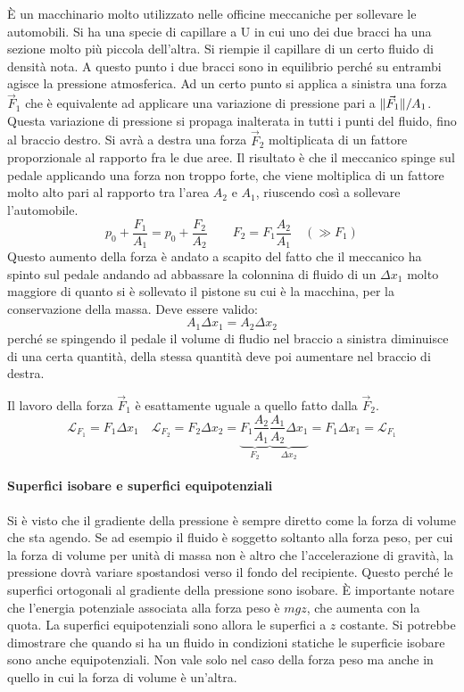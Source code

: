 \documentclass[10pt,a4paper]{book}
\DeclarePairedDelimiter{\norma}{\lVert}{\rVert} %
\begin{document}
\FloatBarrier
È un macchinario molto utilizzato nelle officine meccaniche per sollevare le automobili.  Si ha una specie di capillare a U in cui uno dei due bracci ha una sezione molto più piccola dell'altra. Si riempie il capillare di un certo fluido di densità nota. A questo punto i due bracci sono in equilibrio perché su entrambi agisce la pressione atmosferica. Ad un certo punto si applica a sinistra una forza $\vec{F}_1$ che è equivalente ad applicare una variazione di pressione pari a $\norma{\vec{F}_1}/A_1$. Questa variazione di pressione si propaga inalterata in tutti i punti del fluido, fino al braccio destro. Si avrà a destra una forza $\vec{F}_2$ moltiplicata di un fattore proporzionale al rapporto fra le due aree. Il risultato è che il meccanico spinge sul pedale applicando una forza non troppo forte, che viene moltiplica di un fattore molto alto pari al rapporto tra l'area $A_2$ e $A_1$, riuscendo così a sollevare l'automobile.
\[
	p_0+ \frac{F_1 }{A_1 } = p_0 + \frac{F_2 }{A_2 } \qquad F_2 = F_1\frac{A_2 }{A_1 } \quad (\gg F_1 )
\]
Questo aumento della forza è andato a scapito del fatto che il meccanico ha spinto sul pedale andando ad abbassare la colonnina di fluido di un $\Delta x_1$ molto maggiore di quanto si è sollevato il pistone su cui è la macchina, per la conservazione della massa. Deve essere valido:
\[
	A_1\Delta x_1 = A_2\Delta x_2
\]
perché se spingendo il pedale il volume di fludio nel braccio a sinistra diminuisce di una certa quantità, della stessa quantità deve poi aumentare nel braccio di destra.

Il lavoro della forza $\vec{F}_1$ è esattamente uguale a quello fatto dalla $\vec{F}_2$.
\[
	\mathcal{L}_{F_1 } = F_1 \Delta x_1 \quad \mathcal{L}_{F_2 } = F_2 \Delta x_2 = \underbrace{F_1\frac{A_2}{A_1} }_{F_2} \underbrace{\frac{A_1}{A_2}\Delta x_1}_{\Delta x_2 } = F_1 \Delta x_1 = \mathcal{L}_{F_1}
\]

\paragraph{Superfici isobare e superfici equipotenziali} Si è visto che il gradiente della pressione è sempre diretto come la forza di volume che sta agendo. Se ad esempio il fluido è soggetto soltanto alla forza peso, per cui la forza di volume per unità di massa non è altro che l'accelerazione di gravità, la pressione dovrà variare spostandosi verso il fondo del recipiente. Questo perché le superfici ortogonali al gradiente della pressione sono isobare. È importante notare che l'energia potenziale associata alla forza peso è $mgz$, che aumenta con la quota. La superfici equipotenziali sono allora le superfici a $z$ costante. Si potrebbe dimostrare che quando si ha un fluido in condizioni statiche le superficie isobare sono anche equipotenziali. Non vale solo nel caso della forza peso ma anche in quello in cui la forza di volume è un'altra.
\end{document}

